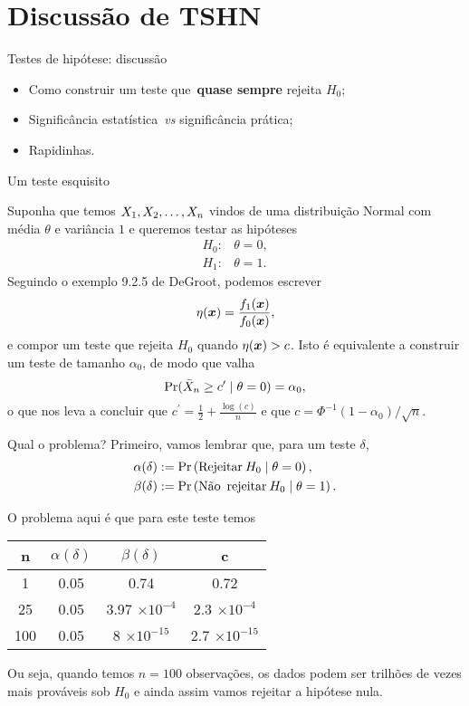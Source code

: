 \section{Discussão de TSHN}
\begin{frame}{Testes de hipótese: discussão}
 \begin{itemize}
 \item Como construir um teste que~\textbf{quase sempre} rejeita $H_0$;
 \item Significância estatística~\textit{vs} significância prática;
 \item Rapidinhas.
 \end{itemize}
\end{frame} 

\begin{frame}{Um teste esquisito}

Suponha que temos $X_1, X_2, \ldots, X_n$ vindos de uma distribuição Normal com média $\theta$ e variância $1$ e queremos testar as hipóteses
\begin{align*}
 H_0:& \theta = 0,\\
 H_1:& \theta = 1.
\end{align*}
Seguindo o exemplo 9.2.5 de DeGroot, podemos escrever
\begin{equation*}
 \eta(\boldsymbol{x}) = \frac{f_1(\boldsymbol{x})}{f_0(\boldsymbol{x})},
\end{equation*}
e compor um teste que rejeita $H_0$ quando $\eta(\boldsymbol{x}) > c$.
Isto é equivalente a construir um teste de tamanho $\alpha_0$, de modo que valha
\begin{equation*}
 \operatorname{Pr}(\bar{X}_n \geq c^\prime \mid \theta = 0) = \alpha_0,
\end{equation*}
o que nos leva a concluir que $c^\prime = \frac{1}{2} + \frac{\log(c)}{n}$ e que $c = \Phi^{-1}(1-\alpha_0)/\sqrt{n}$.
\end{frame}

\begin{frame}{Qual o problema?}
Primeiro, vamos lembrar que, para um teste $\delta$, 
\begin{align*}
 \alpha(\delta)&:= \operatorname{Pr}\left(\text{Rejeitar\:} H_0 \mid \theta = 0\right) ,\\
 \beta(\delta)&:= \operatorname{Pr}\left(\text{Não\, rejeitar\:} H_0 \mid \theta = 1\right).
\end{align*}

 O problema aqui é que para este teste temos
 \begin{table}
  \begin{tabular}{cccc}
   n & $\alpha(\delta)$ & $\beta(\delta)$ & c \\
   \hline
   1 & 0.05 & 0.74 & 0.72 \\
   25 & 0.05 & 3.97 $\times 10^{-4}$  & 2.3 $\times 10^{-4}$ \\
   100 & 0.05 &  8 $\times 10^{-15}$ & 2.7 $\times 10^{-15}$\\
   \hline
  \end{tabular}
 \end{table}
Ou seja, quando temos $n=100$ observações, os dados podem ser trilhões de vezes mais prováveis sob $H_0$ e ainda assim vamos rejeitar a hipótese nula.
\end{frame}

